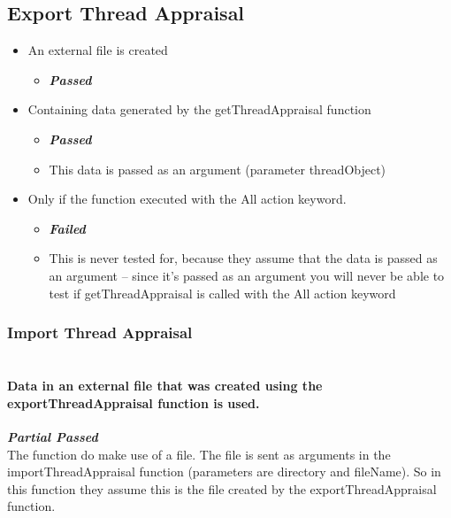 \subsection{Export Thread Appraisal}
\begin{itemize}
	\item An external file is created 
	\begin{itemize}
		\item \color{green}\textbf{\small \emph{Passed}}
	\end{itemize}
	\item Containing data generated by the getThreadAppraisal function  
	\begin{itemize}
		\item \color{green}
\textbf{\small \emph{Passed}} \\\color{black}
		\item This data is passed as an argument (parameter threadObject)
	\end{itemize}
	\item Only if the function executed with the All action keyword.
	\begin{itemize}
		\item \color{red}
\textbf{\small \emph{Failed}} \\ \color{black}
		\item This is never tested for, because they assume that the data is passed as an argument – since it’s passed as an argument you will never be able to test if getThreadAppraisal is called with the All action keyword
	\end{itemize}
\end{itemize}


\subsubsection{Import Thread Appraisal}

\paragraph{\color{black} \\ Data in an external file that was created using the exportThreadAppraisal function is used.\\} 
\color{myOrange}
\textbf{\small \emph{Partial Passed}} \\
\color{black}The function do make use of a file. The file is sent as arguments in the importThreadAppraisal function (parameters are directory and  fileName). So in this function they assume this is the file created by the exportThreadAppraisal function.
\par



